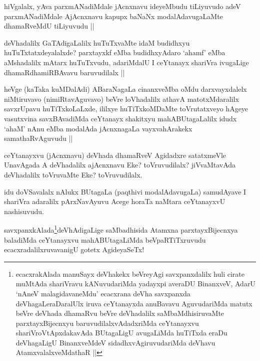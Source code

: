 \begin{artha}
hiVgalalx, yAva parxmANadiMdale jAcnxnavu ideyeMbudu tiLiyuvudo adeV parxmANadiMdale AjAcnxnavu kapupx baNaNx modalAdavugaLaMte dhamaRveMdU tiLiyuvudu ||
\end{artha}

\begin{artha}
deVhadalilx GaTAdigaLalilx huTuTxvaMte idaM budidhxyu huTuTxtatxdeyalalxde? parxtayxkf eMba budidhxyAdaro `ahamf' eMba aMshadalilx mAtarx huTuTxvudu, adariMdalU I ceYtanayx shariVra ivugaLige dhamaRdhamiRBAvavu baruvudilalx ||
\end{artha}

\begin{artha}
heVge (kaTaka kuMDalAdi) ABaraNagaLa cinanxveMba oMdu darxvayxdalelx niMtiruvavo (nimiRtavAguvavo) beVre loVhadalilx athavA matotxMdaralilx savxrUpavu huTiTxkoLaLxde, ililxye huTiTxkoMDaMte toVrutatxveyo hAgeye vasutxvina savxBAvadiMda ceYtanayx shakitxyu mahABUtagaLalilx idudx `ahaM' nAnu eMba modalAda jAcnxnagaLa vayxvahArakekx samathaRvAguvudu ||
\end{artha}

\begin{artha}
ceYtanayxvu (jAcnxnavu) deVhada dhamaRveV Agidadxre satatxmeVle UnavAgada A deVhadalilx ajAcnxnavu Eke? toVruvudilalx? jiVvaMtavAda deVhadalilx toVruvaMte Eke? toVruvudilalx.
\end{artha}

\begin{artha}
idu doVSavalalx nAlukx BUtagaLa (paqthivi modalAdavugaLa) samudAyave I shariVra adaralilx pArxNavAyuvu Acege horaTa naMtara ceYtanayxvU nashisuvudu. 
\end{artha}

\begin{artha}
savxpanxkAlada\footnote[1]{ecacxrakAlada manuSayx deVhakekx beVreyAgi savxpanxdalilx huli cirate muMtAda shariVravu kANuvudariMda yadayxpi  averaDU BinanxveV, AdarU `nAneV malagidavaneMdu' ecacxrana deVha savxpanxda deVhagaLeraDaralUlx iruva ceYtanayxda anuBavavu AguvudariMda matutx beVre deVhada dhamaRvu beVre deVhadalilx saMbaMdhisiruvaMte parxtayxBijecnxyu baruvudilalxvAdadxriMda ceYtanayxvu shariVroVtApxdakavAda BUtagaLigU avugaLiMda huTiTxda eraDu deVhagaLigU BinanxveMdeV sidadhxvAgiruvudariMda deVhavu AtamxvalalxveMdathaR ||}deVhAdigaLige saMbadhisida Atamxna parxtayxBijecnxya baladiMda ceYtanayxvu mahABUtagaLiMda beVpaRTiTxruvudu ecacxradalilxruvavanigU gotetx AgideyaSeTx!
\end{artha}

